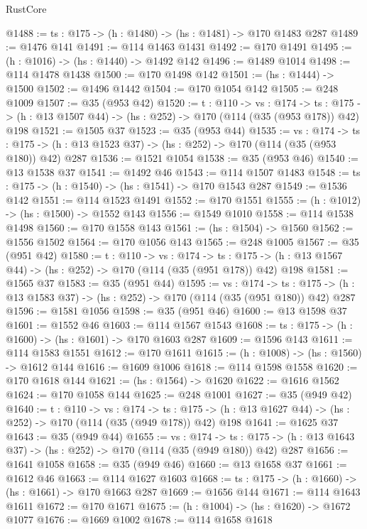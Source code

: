 \begin{lexlean}{RustCore}
\begin{coremodule}
@1488 := {ts : @175} -> (h : @1480) -> (hs : @1481) -> @170 @1483 @287
@1489 := @1476 @141
@1491 := @114 @1463 @1431
@1492 := @170 @1491
@1495 := (h : @1016) -> (hs : @1440) -> @1492 @142
@1496 := @1489 @1014
@1498 := @114 @1478 @1438
@1500 := @170 @1498 @142
@1501 := (hs : @1444) -> @1500
@1502 := @1496 @1442
@1504 := @170 @1054 @142
@1505 := @248 @1009
@1507 := @35 (@953 @42)
@1520 := {t : @110} ->
  {vs : @174} ->
  {ts : @175} -> (h : @13 @1507 @44) -> (hs : @252) -> @170 (@114 (@35 (@953 @178)) @42) @198
@1521 := @1505 @37
@1523 := @35 (@953 @44)
@1535 := {vs : @174} ->
  {ts : @175} -> (h : @13 @1523 @37) -> (hs : @252) -> @170 (@114 (@35 (@953 @180)) @42) @287
@1536 := @1521 @1054
@1538 := @35 (@953 @46)
@1540 := @13 @1538 @37
@1541 := @1492 @46
@1543 := @114 @1507 @1483
@1548 := {ts : @175} -> (h : @1540) -> (hs : @1541) -> @170 @1543 @287
@1549 := @1536 @142
@1551 := @114 @1523 @1491
@1552 := @170 @1551
@1555 := (h : @1012) -> (hs : @1500) -> @1552 @143
@1556 := @1549 @1010
@1558 := @114 @1538 @1498
@1560 := @170 @1558 @143
@1561 := (hs : @1504) -> @1560
@1562 := @1556 @1502
@1564 := @170 @1056 @143
@1565 := @248 @1005
@1567 := @35 (@951 @42)
@1580 := {t : @110} ->
  {vs : @174} ->
  {ts : @175} -> (h : @13 @1567 @44) -> (hs : @252) -> @170 (@114 (@35 (@951 @178)) @42) @198
@1581 := @1565 @37
@1583 := @35 (@951 @44)
@1595 := {vs : @174} ->
  {ts : @175} -> (h : @13 @1583 @37) -> (hs : @252) -> @170 (@114 (@35 (@951 @180)) @42) @287
@1596 := @1581 @1056
@1598 := @35 (@951 @46)
@1600 := @13 @1598 @37
@1601 := @1552 @46
@1603 := @114 @1567 @1543
@1608 := {ts : @175} -> (h : @1600) -> (hs : @1601) -> @170 @1603 @287
@1609 := @1596 @143
@1611 := @114 @1583 @1551
@1612 := @170 @1611
@1615 := (h : @1008) -> (hs : @1560) -> @1612 @144
@1616 := @1609 @1006
@1618 := @114 @1598 @1558
@1620 := @170 @1618 @144
@1621 := (hs : @1564) -> @1620
@1622 := @1616 @1562
@1624 := @170 @1058 @144
@1625 := @248 @1001
@1627 := @35 (@949 @42)
@1640 := {t : @110} ->
  {vs : @174} ->
  {ts : @175} -> (h : @13 @1627 @44) -> (hs : @252) -> @170 (@114 (@35 (@949 @178)) @42) @198
@1641 := @1625 @37
@1643 := @35 (@949 @44)
@1655 := {vs : @174} ->
  {ts : @175} -> (h : @13 @1643 @37) -> (hs : @252) -> @170 (@114 (@35 (@949 @180)) @42) @287
@1656 := @1641 @1058
@1658 := @35 (@949 @46)
@1660 := @13 @1658 @37
@1661 := @1612 @46
@1663 := @114 @1627 @1603
@1668 := {ts : @175} -> (h : @1660) -> (hs : @1661) -> @170 @1663 @287
@1669 := @1656 @144
@1671 := @114 @1643 @1611
@1672 := @170 @1671
@1675 := (h : @1004) -> (hs : @1620) -> @1672 @1077
@1676 := @1669 @1002
@1678 := @114 @1658 @1618

\end{coremodule}
\end{lexlean}
